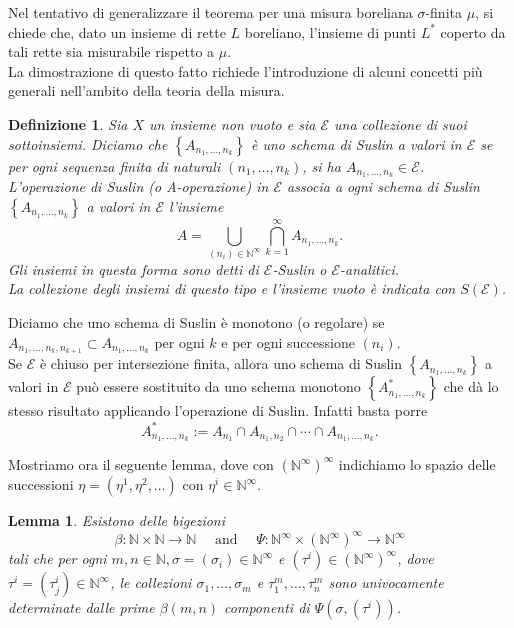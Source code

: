 \documentclass[a4paper, twoside,openright]{article}
\newcommand{\<}{\langle}
\renewcommand{\>}{\rangle}
\newtheorem{lemma}[teo]{Lemma}
\newtheorem{defin}[teo]{Definizione}
\begin{document}
Nel tentativo di generalizzare il teorema per una misura boreliana $\sigma$-finita $\mu$, si chiede che, dato un insieme di rette $L$ boreliano, l'insieme di punti $L^*$ coperto da tali rette sia misurabile rispetto a $\mu$.\\
La dimostrazione di questo fatto richiede l'introduzione di alcuni concetti più generali nell'ambito della teoria della misura.

\begin{defin}
	Sia $X$ un insieme non vuoto e sia $\mathcal{E}$ una collezione di suoi sottoinsiemi. Diciamo che $\left\{A_{n_{1}, \ldots, n_{k}}\right\}$ è uno schema di Suslin a valori in $\mathcal{E}$ se per ogni sequenza finita di naturali $\left(n_{1}, \ldots, n_{k}\right)$, si ha $A_{n_{1}, \ldots, n_{k}} \in \mathcal{E}$.\\
	L'operazione di Suslin (o A-operazione) in $\mathcal{E}$ associa a ogni schema di Suslin $\left\{A_{n_{1}, \ldots, n_{k}}\right\}$ a valori in $\mathcal{E}$ l'insieme
	$$
	A=\bigcup_{\left(n_{i}\right) \in \mathbb{N}^{\infty}} \bigcap_{k=1}^{\infty} A_{n_{1}, \ldots, n_{k}} .
	$$
	Gli insiemi in questa forma sono detti di $\mathcal{E}$-Suslin o $\mathcal{E}$-analitici. \\
	La collezione degli insiemi di questo tipo e l'insieme vuoto è indicata con $S(\mathcal{E})$.
\end{defin}	

Diciamo che uno schema di Suslin è monotono (o regolare) se $A_{n_{1}, \ldots, n_{k}, n_{k+1}} \subset A_{n_{1}, \ldots, n_{k}}$ per ogni $k$ e per ogni successione $(n_i)$.\\
Se $\mathcal{E}$ è chiuso per intersezione finita, allora uno schema di Suslin $\left\{A_{n_{1}, \ldots, n_{k}}\right\}$ a valori in $\mathcal{E}$ può essere sostituito da uno schema monotono $\left\{A^*_{n_{1}, \ldots, n_{k}}\right\}$ che dà lo stesso risultato applicando l'operazione di Suslin. Infatti basta porre 
$$
A_{n_{1}, \ldots, n_{k}}^{*}:=A_{n_{1}} \cap A_{n_{1}, n_{2}} \cap \cdots \cap A_{n_{1}, \ldots, n_{k}} .
$$

Mostriamo ora il seguente lemma, dove con $\left(\mathbb{N}^{\infty}\right)^{\infty}$ indichiamo lo spazio delle successioni $\eta=\left(\eta^{1}, \eta^{2}, \ldots\right)$ con $\eta^{i} \in \mathbb{N}^{\infty}$.

\begin{lemma}
	Esistono delle bigezioni
	$$	\beta: \mathbb{N} \times \mathbb{N} \rightarrow \mathbb{N} \quad \text { and } \quad \Psi: \mathbb{N}^{\infty} \times\left(\mathbb{N}^{\infty}\right)^{\infty} \rightarrow \mathbb{N}^{\infty}
	$$
	tali che per ogni $m, n \in \mathbb{N}, \sigma=\left(\sigma_{i}\right) \in \mathbb{N}^{\infty}$ e $\left(\tau^{i}\right) \in\left(\mathbb{N}^{\infty}\right)^{\infty}$, dove $\tau^{i}=\left(\tau_{j}^{i}\right) \in \mathbb{N}^{\infty}$, le collezioni $\sigma_{1}, \ldots, \sigma_{m}$ e $\tau_{1}^{m}, \ldots, \tau_{n}^{m}$ sono univocamente determinate dalle prime $\beta(m, n)$ componenti di $\Psi\left(\sigma,\left(\tau^{i}\right)\right)$.
\end{lemma}	
\end{document}
